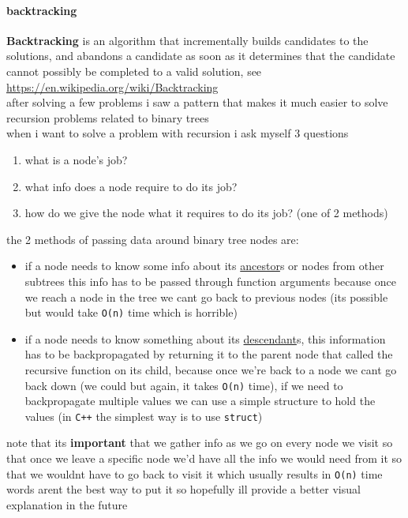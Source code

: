 \documentclass[a4paper,12pt]{article}
\begin{document}
\paragraph{backtracking}
\label{sec:orgee54fe7}
\textbf{Backtracking} is an algorithm that incrementally builds candidates to the solutions, and abandons a candidate as soon as it determines that the candidate cannot possibly be completed to a valid solution, see \url{https://en.wikipedia.org/wiki/Backtracking}\\[0pt]
after solving a few problems i saw a pattern that makes it much easier to solve recursion problems related to binary trees\\[0pt]
when i want to solve a problem with recursion i ask myself 3 questions\\[0pt]
\begin{enumerate}
\item what is a node's job?\\[0pt]
\item what info does a node require to do its job?\\[0pt]
\item how do we give the node what it requires to do its job? (one of 2 methods)\\[0pt]
\end{enumerate}
the 2 methods of passing data around binary tree nodes are:\\[0pt]
\begin{itemize}
\item if a node needs to know some info about its \hyperref[sec:org48e7ebc]{ancestor}s or nodes from other subtrees this info has to be passed through function arguments because once we reach a node in the tree we cant go back to previous nodes (its possible but would take \texttt{O(n)} time which is horrible)\\[0pt]
\item if a node needs to know something about its \hyperref[sec:org3e6c055]{descendant}s, this information has to be backpropagated by returning it to the parent node that called the recursive function on its child, because once we're back to a node we cant go back down (we could but again, it takes \texttt{O(n)} time), if we need to backpropagate multiple values we can use a simple structure to hold the values (in \texttt{C++} the simplest way is to use \texttt{struct})\\[0pt]
\end{itemize}
note that its \textbf{important} that we gather info as we go on every node we visit so that once we leave a specific node we'd have all the info we would need from it so that we wouldnt have to go back to visit it which usually results in \texttt{O(n)} time\\[0pt]
words arent the best way to put it so hopefully ill provide a better visual explanation in the future\\[0pt]
\end{document}
